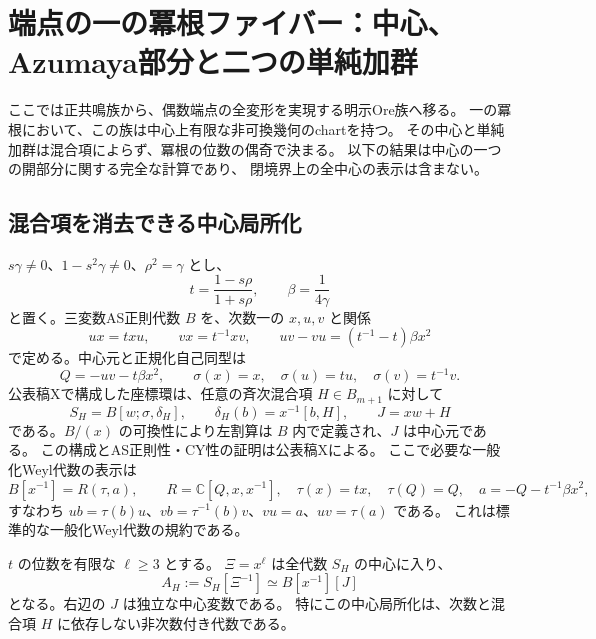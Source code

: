 \section{端点の一の冪根ファイバー：中心、Azumaya部分と二つの単純加群}
\label{sec:endpoint-root-unity-v38}

ここでは正共鳴族から、偶数端点の全変形を実現する明示Ore族へ移る。
一の冪根において、この族は中心上有限な非可換幾何のchartを持つ。
その中心と単純加群は混合項によらず、冪根の位数の偶奇で決まる。
以下の結果は中心の一つの開部分に関する完全な計算であり、
閉境界上の全中心の表示は含まない。

\subsection{混合項を消去できる中心局所化}

$s\gamma\ne0$、$1-s^2\gamma\ne0$、$\rho^2=\gamma$ とし、
\[
 t=\frac{1-s\rho}{1+s\rho},\qquad \beta=\frac1{4\gamma}
\]
と置く。三変数AS正則代数 $B$ を、次数一の $x,u,v$ と関係
\begin{equation}
\label{eq:root-B-v38}
 ux=txu,\qquad vx=t^{-1}xv,\qquad
 uv-vu=(t^{-1}-t)\beta x^2
\end{equation}
で定める。中心元と正規化自己同型は
\[
 Q=-uv-t\beta x^2,\qquad
 \sigma(x)=x,\quad \sigma(u)=tu,\quad \sigma(v)=t^{-1}v.
\]
公表稿Xで構成した座標環は、任意の斉次混合項 $H\in B_{m+1}$ に対して
\[
 S_H=B[w;\sigma,\delta_H],\qquad
 \delta_H(b)=x^{-1}[b,H],\qquad J=xw+H
\]
である。$B/(x)$ の可換性により左割算は $B$ 内で定義され、$J$ は中心元である。
この構成とAS正則性・CY性の証明は公表稿X\cite{VKCategories36}による。
ここで必要な一般化Weyl代数の表示は
\[
 B[x^{-1}]=R(\tau,a),\qquad
 R=\mathbb C[Q,x,x^{-1}],\quad \tau(x)=tx,\quad \tau(Q)=Q,
 \quad a=-Q-t^{-1}\beta x^2,
\]
すなわち $ub=\tau(b)u$、$vb=\tau^{-1}(b)v$、$vu=a$、$uv=\tau(a)$ である。
これは標準的な一般化Weyl代数の規約\cite{SuarezVivas2015Root38}である。

\begin{lemma}[中心の開部分から混合項を消す]
\label{lem:root-localization-v38}
$t$ の位数を有限な $\ell\ge3$ とする。
$\Xi=x^\ell$ は全代数 $S_H$ の中心に入り、
\begin{equation}
\label{eq:root-central-chart-v38}
 A_H:=S_H[\Xi^{-1}]
 \simeq B[x^{-1}][J]
\end{equation}
となる。右辺の $J$ は独立な中心変数である。
特にこの中心局所化は、次数と混合項 $H$ に依存しない非次数付き代数である。
\end{lemma}

